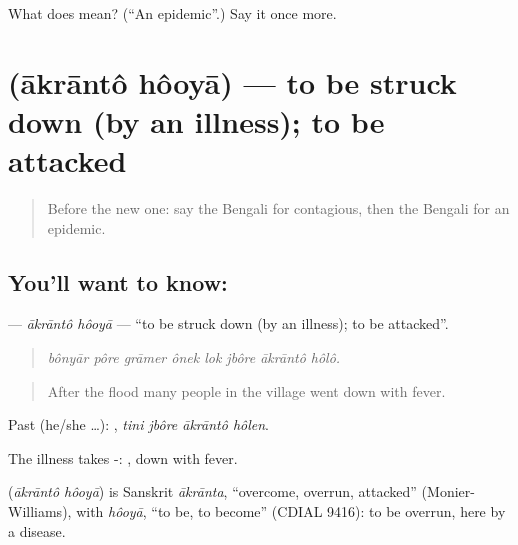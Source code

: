 \begin{tcolorbox}[breakable,colback=teal!4,colframe=teal!35!black,title={Before you move on}]
What does  mean? (\textquotedblleft{}An epidemic\textquotedblright{}.) Say it once more.
\end{tcolorbox}
\section[\texorpdfstring{\bn{আক্রান্ত} \bn{হওয়া} (ākrāntô hôoyā)}{আক্রান্ত হওয়া (ākrāntô hôoyā)}]{  (ākrāntô hôoyā) — to be struck down (by an illness); to be attacked}

\label{lesson:BN-C473-akranto-hooya}



\begin{quote}
Before the new one: say the Bengali for contagious, then the Bengali for an epidemic.
\end{quote}

\subsection*{You'll want to know:  }
\textbf{ } — \emph{ākrāntô hôoyā} — \textquotedblleft{}to be struck down (by an illness); to be attacked\textquotedblright{}.

\begin{quote}
       
\end{quote}

\begin{quote}
\emph{bônyār pôre grāmer ônek lok jbôre ākrāntô hôlô.}
\end{quote}

\begin{quote}
After the flood many people in the village went down with fever.
\end{quote}

Past (he/she …):    , \emph{tini jbôre ākrāntô hôlen}.

The illness takes -:  , down with fever.

\begin{cousinweb}
\textbf{ } (\emph{ākrāntô hôoyā}) is Sanskrit \emph{ākrānta}, \textquotedblleft{}overcome, overrun, attacked\textquotedblright{} (Monier-Williams), with \emph{hôoyā}, \textquotedblleft{}to be, to become\textquotedblright{} (CDIAL 9416): to be overrun, here by a disease.
\end{cousinweb}

